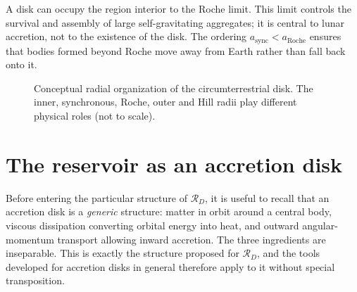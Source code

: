 \documentclass[11pt,a4paper,openany]{report}
\newcommand{\aR}{a_{\mathrm{Roche}}}
\newcommand{\RD}{\mathcal{R}_{D}}
\begin{document}
\begin{lecture}
A disk can occupy the region interior to the Roche limit. This limit controls the survival and
assembly of large self-gravitating aggregates; it is central to lunar accretion, not to the
existence of the disk. The ordering $a_{\mathrm{sync}}<\aR$ ensures that bodies formed beyond Roche
move away from Earth rather than fall back onto it.
\end{lecture}

\begin{figure}[htbp]
\centering
{}
\caption{Conceptual radial organization of the circumterrestrial disk. The inner, synchronous,
Roche, outer and Hill radii play different physical roles (not to scale).}
\label{fig:radial}
\end{figure}

\section{The reservoir as an accretion disk}
\label{sec:disque-accretion}

Before entering the particular structure of $\RD$, it is useful to recall that an accretion disk is
a \emph{generic} structure: matter in orbit around a central body, viscous dissipation converting
orbital energy into heat, and outward angular-momentum transport allowing inward accretion. The
three ingredients are inseparable. This is exactly the structure proposed for $\RD$, and the tools
developed for accretion disks in general \cite{ShakuraSunyaev1973,Pringle1981,FrankKingRaine2002}
therefore apply to it without special transposition.
\end{document}
